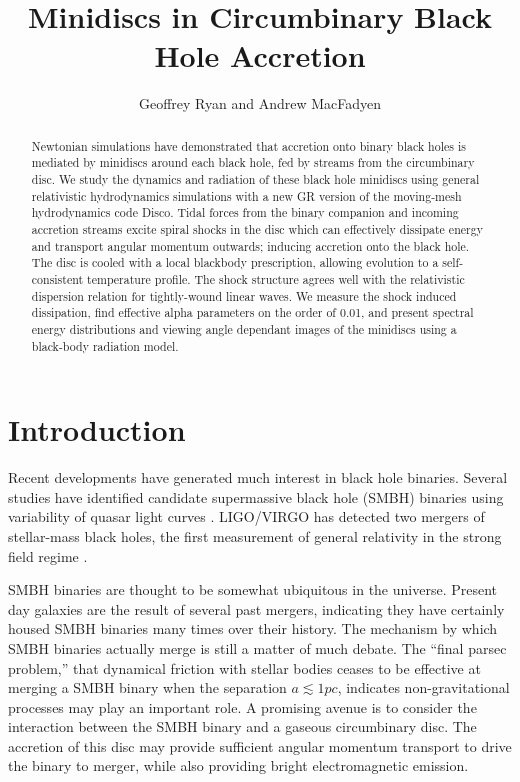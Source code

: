 \documentclass{emulateapj}
\begin{document}
\title{Minidiscs in Circumbinary Black Hole Accretion}
\author{Geoffrey Ryan and Andrew MacFadyen}

\begin{abstract}

Newtonian simulations have demonstrated that accretion onto binary black holes is mediated by minidiscs around each black hole, fed by streams from the circumbinary disc. We study the dynamics and radiation of these black hole minidiscs using general relativistic hydrodynamics simulations with a new GR version of the moving-mesh hydrodynamics code Disco. Tidal forces from the binary companion and incoming accretion streams excite spiral shocks in the disc which can effectively dissipate energy and transport angular momentum outwards; inducing accretion onto the black hole. The disc is cooled with a local blackbody prescription, allowing evolution to a self-consistent temperature profile.  The shock structure agrees well with the relativistic dispersion relation for tightly-wound linear waves. We measure the shock induced dissipation, find effective alpha parameters on the order of 0.01, and present spectral energy distributions and viewing angle dependant images of the minidiscs using a black-body radiation model.

\end{abstract}



\section{Introduction}
\label{sec:intro}

Recent developments have generated much interest in black hole binaries.  Several studies have identified candidate supermassive black hole (SMBH) binaries using variability of quasar light curves \citep{Graham15, Charisi16}.  LIGO/VIRGO has detected two mergers of stellar-mass black holes, the first measurement of general relativity in the strong field regime \citep{LIGO16GW150914Discovery}.

SMBH binaries are thought to be somewhat ubiquitous in the universe.  Present day galaxies are the result of several past mergers, indicating they have certainly housed SMBH binaries many times over their history. The mechanism by which SMBH binaries actually merge is still a matter of much debate. The ``final parsec problem,'' that dynamical friction with stellar bodies ceases to be effective at merging a SMBH binary when the separation $a \lesssim 1pc$, indicates non-gravitational processes may play an important role.  A promising avenue is to consider the interaction between the SMBH binary and a gaseous circumbinary disc.  The accretion of this disc may provide sufficient angular momentum transport to drive the binary to merger, while also providing bright electromagnetic emission.
\end{document}
